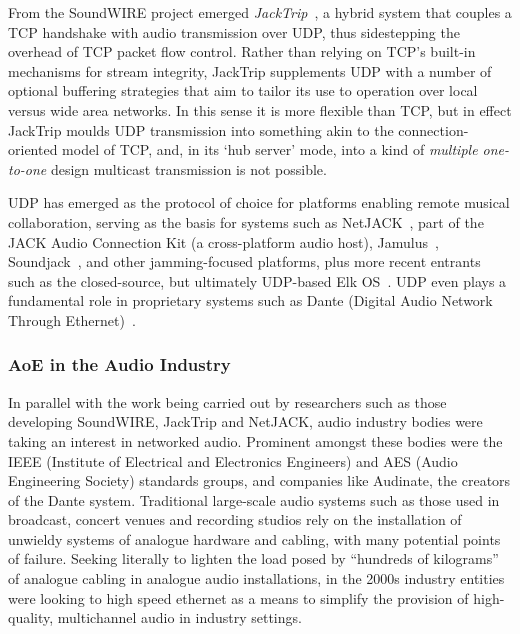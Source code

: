 From the SoundWIRE project emerged
\textit{JackTrip}~\citep{caceres_jacktrip_2010,caceras_jacktripsoundwire_2010},
a hybrid system that couples a TCP handshake with audio transmission over UDP,
thus sidestepping the overhead of TCP packet flow control.
Rather than relying on TCP's built-in mechanisms for stream integrity, JackTrip
supplements UDP with a number of optional buffering strategies that aim to
tailor its use to operation over local versus wide area networks.
In this sense it is more flexible than TCP, but in effect JackTrip moulds UDP
transmission into something akin to the connection-oriented model of TCP, and,
in its `hub server' mode, into a kind of \textit{multiple one-to-one} design
\textemdash{} multicast transmission is not possible.

UDP has emerged as the protocol of choice for platforms enabling remote musical
collaboration, serving as the basis for systems such as
NetJACK~\citep{carot_netjack_2009}, part of the JACK Audio Connection Kit (a
cross-platform audio host), Jamulus~\citep{fischer_case_2015},
Soundjack~\citep{renaud_networked_2012}, and other jamming-focused platforms,
plus more recent entrants such as the closed-source, but ultimately UDP-based
Elk OS~\citep{turchet_elk_2021}.
UDP even plays a fundamental role in proprietary systems such as Dante (Digital
Audio Network Through Ethernet)~\citep{dante_what_2022}.

\subsubsection{AoE in the Audio Industry}

In parallel with the work being carried out by researchers such as those
developing SoundWIRE, JackTrip and NetJACK, audio industry bodies were taking
an interest in networked audio.
Prominent amongst these bodies were the IEEE (Institute of Electrical and
Electronics Engineers) and AES (Audio Engineering Society) standards groups,
and companies like Audinate, the creators of the Dante system.
Traditional large-scale audio systems such as those used in broadcast, concert
venues and recording studios rely on the installation of unwieldy systems of
analogue hardware and cabling, with many potential points of failure.
Seeking literally to lighten the load posed by ``hundreds of
kilograms''~\citep{bakker_introduction_2014} of analogue cabling in analogue
audio installations, in the 2000s industry entities were looking to high speed
ethernet as a means to simplify the provision of high-quality, multichannel
audio in industry settings.

